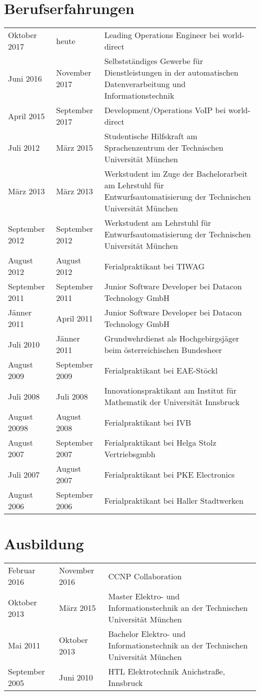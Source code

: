 \section*{Berufserfahrungen}
\begin{tabularx}{\textwidth}{l|l|l}
Oktober 2017 & heute & Leading Operations Engineer bei world-direct \\
Juni 2016 & November 2017 & Selbstständiges Gewerbe für Dienstleistungen in der automatischen Datenverarbeitung und Informationstechnik \\
April 2015 & September 2017 & Development/Operations VoIP bei world-direct \\
Juli 2012 & März 2015 & Studentische Hilfskraft am Sprachenzentrum der Technischen Universität München \\
März 2013 & März 2013 & Werkstudent im Zuge der Bachelorarbeit am Lehrstuhl für Entwurfsautomatisierung der Technischen Universität München \\
September 2012 & September 2012 & Werkstudent am Lehrstuhl für Entwurfsautomatisierung der Technischen Universität München \\
August 2012 & August 2012 & Ferialpraktikant bei TIWAG \\
September 2011 & September 2011 & Junior Software Developer bei Datacon Technology GmbH \\
Jänner 2011 & April 2011 & Junior Software Developer bei Datacon Technology GmbH \\
Juli 2010 & Jänner 2011 & Grundwehrdienst als Hochgebirgsjäger beim österreichischen Bundesheer \\
August 2009 & September 2009 & Ferialpraktikant bei EAE-Stöckl \\
Juli 2008 & Juli 2008 & Innovationspraktikant am Institut für Mathematik der Universität Innsbruck \\
August 20098 & August 2008 & Ferialpraktikant bei IVB \\
August 2007 & September 2007 & Ferialpraktikant bei Helga Stolz Vertriebsgmbh \\
Juli 2007 & August 2007 & Ferialpraktikant bei PKE Electronics \\
August 2006 & September 2006 & Ferialpraktikant bei Haller Stadtwerken
\end{tabularx}

\section*{Ausbildung}
\begin{tabularx}{\textwidth}{l|l|l}
Februar 2016 & November 2016 & CCNP Collaboration \\
Oktober 2013 & März 2015 & Master Elektro- und Informationstechnik an der Technischen Universität München \\
Mai 2011 & Oktober 2013 & Bachelor Elektro- und Informationstechnik an der Technischen Universität München \\
September 2005 & Juni 2010 & HTL Elektrotechnik Anichstraße, Innsbruck
\end{tabularx}

